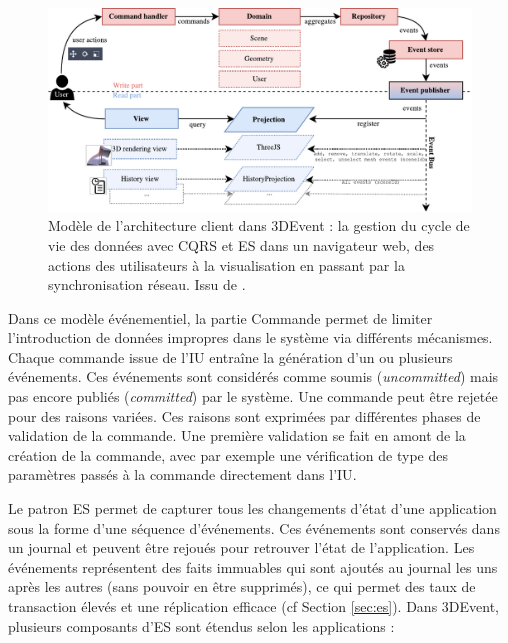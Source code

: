 \begin{figure}[h]
	\centering
	\includegraphics[width=\columnwidth]{eps/cqrs2.pdf}
	\caption[Modèle de l'architecture client dans 3DEvent]{Modèle de l'architecture 
		client dans 3DEvent : la gestion du cycle de vie des données avec 
		\gls{CQRS} 
		et \gls{ES} dans un navigateur web, des actions des utilisateurs à la visualisation 
		en passant par la synchronisation réseau. Issu de \cite{Desprat2017}.}
	\label{fig:cqrs-client}
\end{figure}


Dans ce modèle événementiel, la partie Commande permet de limiter l'introduction 
de données impropres dans le système via différents mécanismes. Chaque 
commande issue de l'\gls{IU} entraîne la génération d'un ou plusieurs événements. 
Ces événements sont considérés 
comme \og soumis\fg{} (\textit{uncommitted}) mais pas encore \og publiés\fg{} 
(\textit{committed}) par le système.
Une commande peut être rejetée pour des raisons variées. Ces raisons sont 
exprimées par différentes phases de validation de la commande.
Une première validation se fait en amont de la création de la commande, avec par 
exemple une vérification de type des paramètres passés à la commande directement
dans l'\gls{IU}.

Le patron \gls{ES} permet de capturer tous les changements d'état 
d'une application sous la forme d'une séquence d'événements. 
Ces événements sont conservés dans un journal et peuvent être 
rejoués pour retrouver l'état de l'application. 
Les événements représentent des faits immuables qui sont ajoutés au journal les
uns après les autres (sans pouvoir en être supprimés), ce qui permet des taux de 
transaction élevés et une réplication efficace (cf Section 
\ref{sec:es}). Dans 3DEvent, plusieurs composants d'\gls{ES} sont étendus selon 
les applications :

